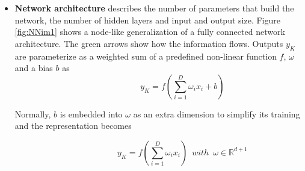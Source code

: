 \begin{itemize}
\item \textbf{Network architecture} describes the number of parameters that build the network, the number of hidden layers and input and output size. Figure \ref{fig:NNim1} shows a node-like generalization of a  fully connected network architecture. The green arrows show how the information flows. Outputs $y_K$ are parameterize as a weighted sum of a predefined non-linear function $f$, $\omega$ and a bias $b$ as
\begin{equation} \label{eq:paramNN}
\hspace{3em} \hspace{3em} \hspace{3em} y_K = f ( \sum_{i=1}^D \omega_i x_i + b  ) \enspace \hspace{3em}
\end{equation} 


Normally, $b$ is embedded into $\omega$ as an extra dimension to simplify its training and the representation becomes  

\begin{equation} \label{eq:paramNN}
\hspace{3em} \hspace{3em} \hspace{3em} y_K = f ( \sum_{i=1}^D \omega_i x_i  ) \enspace with \enspace  \omega \in \mathbb{R}^{d+1} \enspace \hspace{3em}
\end{equation}   


\end{itemize}
